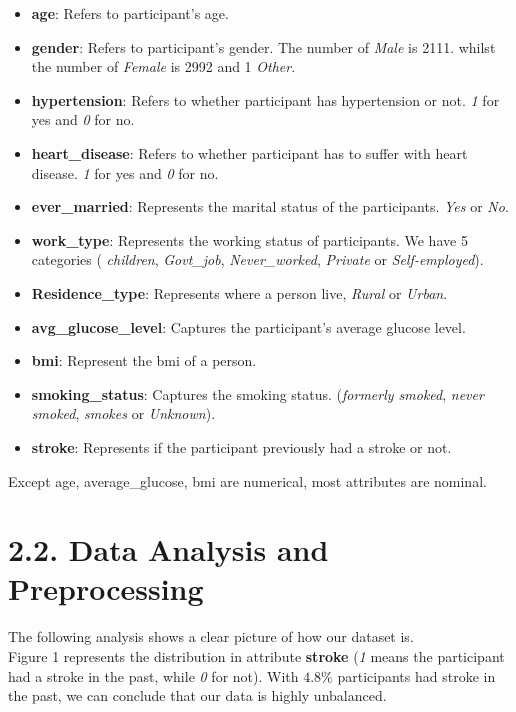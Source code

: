 \documentclass[a4paper]{report}
\begin{document}
	\begin{itemize} \Large
		\item \textbf{age}: Refers to participant's age.
		\item \textbf{gender}: Refers to participant's gender. The number of \emph{Male} is 2111. whilst the number of \emph{Female} is 2992 and 1 \emph{Other}.
		\item \textbf{hypertension}: Refers to whether participant has hypertension or not. \emph{1} for yes and \emph{0} for no.
		\item \textbf{heart\_disease}: Refers to whether participant has to suffer with heart disease. \emph{1} for yes and \emph{0} for no.
		\item \textbf{ever\_married}: Represents the marital status of the participants. \emph{Yes} or \emph{No}.
		\item \textbf{work\_type}: Represents the working status of participants. We have 5 categories ( \emph{children}, \emph{Govt\_job}, \emph{Never\_worked}, \emph{Private} or \emph{Self-employed}).
		\item \textbf{Residence\_type}: Represents where a person live, \emph{Rural} or \emph{Urban}.
		\item \textbf{avg\_glucose\_level}: Captures the participant's average glucose level.
		\item \textbf{bmi}: Represent the bmi of a person.
		\item \textbf{smoking\_status}: Captures the smoking status. (\emph{formerly smoked}, \emph{never smoked}, \emph{smokes} or \emph{Unknown}).
		\item \textbf{stroke}: Represents if the participant previously had a stroke or not.
		
	\end{itemize}
	\Large
	Except age, average\_glucose, bmi are numerical, most attributes are nominal.
	
	\section*{\Large 2.2. Data Analysis and Preprocessing}
	\Large
	The following analysis shows a clear picture of how our dataset is. \\
	
	Figure 1 represents the distribution in attribute \textbf{stroke} (\emph{1} means the participant had a stroke in the past, while \emph{0} for not). With $4.8\%$ participants had stroke in the past, we can conclude that our data is highly unbalanced.
	
\end{document}
